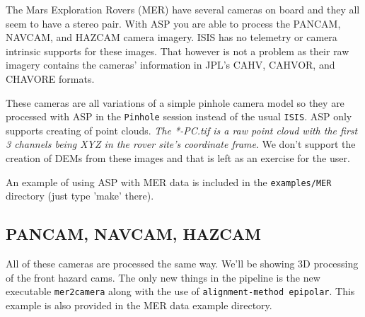 The Mars Exploration Rovers (MER) have several cameras on board
and they all seem to have a stereo pair. With ASP you are able to
process the PANCAM, NAVCAM, and HAZCAM camera imagery. ISIS has no
telemetry or camera intrinsic supports for these images. That however is
not a problem as their raw imagery contains the cameras' information in
JPL's CAHV, CAHVOR, and CHAVORE formats.

These cameras are all variations of a simple pinhole camera model so
they are processed with ASP in the \texttt{Pinhole} session instead of
the usual \texttt{ISIS}. ASP only supports creating of point
clouds. \emph{The *-PC.tif is a raw point cloud with the first 3
  channels being XYZ in the rover site's coordinate frame}. We don't
support the creation of DEMs from these images and that is left as an
exercise for the user.

An example of using ASP with MER data is included in the
\texttt{examples/MER} directory (just type 'make' there).

\subsection{PANCAM, NAVCAM, HAZCAM}

All of these cameras are processed the same way. We'll be showing 3D
processing of the front hazard cams. The only new things in the
pipeline is the new executable \texttt{mer2camera} along with the use
of \texttt{alignment-method epipolar}. This example is also provided
in the MER data example directory.


